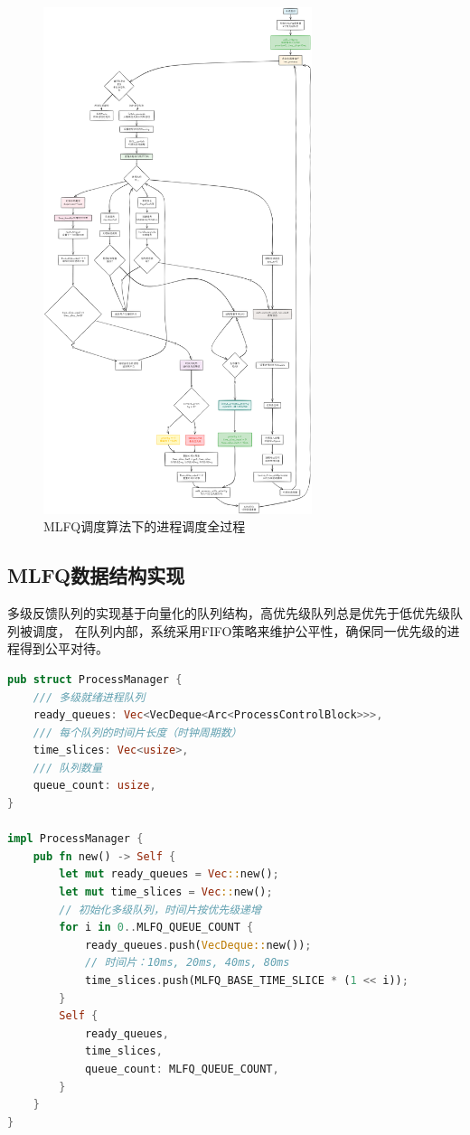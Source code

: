 \begin{figure}[htbp]
    \centering
    \includegraphics[width=0.7\textwidth]{../image/MLFQ进程调度过程.png}
    \caption{MLFQ调度算法下的进程调度全过程}
    \label{fig:mlfq-scheduling}
\end{figure}

\clearpage

\subsection{MLFQ数据结构实现}

多级反馈队列的实现基于向量化的队列结构，高优先级队列总是优先于低优先级队列被调度，
在队列内部，系统采用FIFO策略来维护公平性，确保同一优先级的进程得到公平对待。

\begin{lstlisting}[language=Rust,caption={MLFQ进程管理器结构}, label={lst:mlfq-manager}]
pub struct ProcessManager {
    /// 多级就绪进程队列
    ready_queues: Vec<VecDeque<Arc<ProcessControlBlock>>>,
    /// 每个队列的时间片长度（时钟周期数）
    time_slices: Vec<usize>,
    /// 队列数量
    queue_count: usize,
}

impl ProcessManager {
    pub fn new() -> Self {
        let mut ready_queues = Vec::new();
        let mut time_slices = Vec::new();
        // 初始化多级队列，时间片按优先级递增
        for i in 0..MLFQ_QUEUE_COUNT {
            ready_queues.push(VecDeque::new());
            // 时间片：10ms, 20ms, 40ms, 80ms
            time_slices.push(MLFQ_BASE_TIME_SLICE * (1 << i));
        }
        Self {
            ready_queues,
            time_slices,
            queue_count: MLFQ_QUEUE_COUNT,
        }
    }
}
\end{lstlisting}

